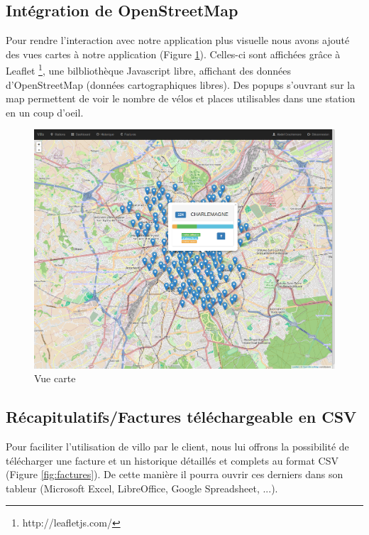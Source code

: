 \documentclass[a4paper,10pt]{article}
\begin{document}
\subsection{Intégration de OpenStreetMap}
Pour rendre l'interaction avec notre application plus visuelle nous avons ajouté
des vues cartes à notre application (Figure \ref{fig:map}). Celles-ci sont affichées grâce à Leaflet
\footnote{http://leafletjs.com/}, une bilbliothèque Javascript libre, affichant
des données d'OpenStreetMap (données cartographiques libres). Des popups
s'ouvrant sur la map permettent de voir le nombre de vélos et places utilisables
dans une station en un coup d'oeil.

\begin{figure}[H]
  \centering
  \includegraphics[scale=0.2]{map.png}
  \caption{\label{fig:map} Vue carte}
\end{figure}

\subsection{Récapitulatifs/Factures téléchargeable en CSV} %

Pour faciliter l'utilisation de villo par le client, nous lui offrons la possibilité
de télécharger une facture et un historique détaillés et complets au format CSV (Figure \ref{fig:factures}).
De cette manière il pourra ouvrir ces derniers dans son tableur (Microsoft Excel,
LibreOffice, Google Spreadsheet, ...).
\end{document}
